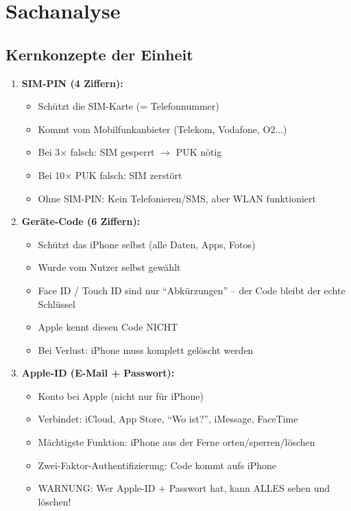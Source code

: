 \documentclass[11pt,a4paper]{article}
\begin{document}
\section{Sachanalyse}

\subsection{Kernkonzepte der Einheit}

\begin{enumerate}
    \item \textbf{SIM-PIN (4 Ziffern):}
    \begin{itemize}
        \item Schützt die SIM-Karte (= Telefonnummer)
        \item Kommt vom Mobilfunkanbieter (Telekom, Vodafone, O2...)
        \item Bei 3× falsch: SIM gesperrt $\rightarrow$ PUK nötig
        \item Bei 10× PUK falsch: SIM zerstört
        \item Ohne SIM-PIN: Kein Telefonieren/SMS, aber WLAN funktioniert
    \end{itemize}

    \item \textbf{Geräte-Code (6 Ziffern):}
    \begin{itemize}
        \item Schützt das iPhone selbst (alle Daten, Apps, Fotos)
        \item Wurde vom Nutzer selbst gewählt
        \item Face ID / Touch ID sind nur ``Abkürzungen'' -- der Code bleibt der echte Schlüssel
        \item Apple kennt diesen Code NICHT
        \item Bei Verlust: iPhone muss komplett gelöscht werden
    \end{itemize}

    \item \textbf{Apple-ID (E-Mail + Passwort):}
    \begin{itemize}
        \item Konto bei Apple (nicht nur für iPhone)
        \item Verbindet: iCloud, App Store, ``Wo ist?'', iMessage, FaceTime
        \item Mächtigste Funktion: iPhone aus der Ferne orten/sperren/löschen
        \item Zwei-Faktor-Authentifizierung: Code kommt aufs iPhone
        \item WARNUNG: Wer Apple-ID + Passwort hat, kann ALLES sehen und löschen!
    \end{itemize}
\end{enumerate}
\end{document}
